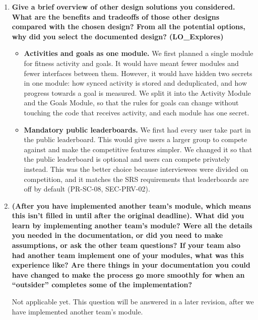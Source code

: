 \documentclass[12pt, titlepage]{article}
\begin{document}
\begin{enumerate}
  Time is our main limit. With more time we would support other mobile
  operating systems, most importantly iOS, which two of our interviewees use.
  We are also limited in the number of people on the team and in the AI
  credits available to us. With more resources, we would run more thorough
  beta testing and user testing to check that the design works for the people
  we are building it for.

  \item \textbf{Give a brief overview of other design solutions you
  considered. What are the benefits and tradeoffs of those other designs
  compared with the chosen design? From all the potential options, why did
  you select the documented design? (LO\_Explores)}

  \begin{itemize}
  \item \textbf{Activities and goals as one module.} We first planned a single
    module for fitness activity and goals. It would have meant fewer modules
    and fewer interfaces between them. However, it would have hidden two
    secrets in one module: how synced activity is stored and deduplicated, and
    how progress towards a goal is measured. We split it into the Activity
    Module and the Goals Module, so that the rules for goals can change without
    touching the code that receives activity, and each module has one secret.
  \item \textbf{Mandatory public leaderboards.} We first had every user take
    part in the public leaderboard. This would give users a larger group to
    compete against and make the competitive features simpler. We changed it
    so that the public leaderboard is optional and users can compete privately
    instead. This was the better choice because interviewees were divided on
    competition, and it matches the SRS requirements that leaderboards are off
    by default (PR-SC-08, SEC-PRV-02).
  \end{itemize}

  \item \textbf{(After you have implemented another team's module, which means
  this isn't filled in until after the original deadline). What did you learn
  by implementing another team's module? Were all the details you needed in
  the documentation, or did you need to make assumptions, or ask the other team
  questions? If your team also had another team implement one of your modules,
  what was this experience like? Are there things in your documentation you
  could have changed to make the process go more smoothly for when an
  ``outsider'' completes some of the implementation?}

  Not applicable yet. This question will be answered in a later revision,
  after we have implemented another team's module.

\end{enumerate}
\end{document}
